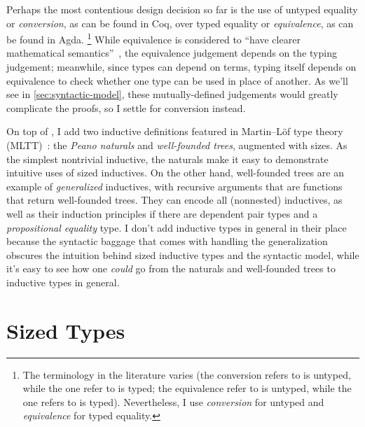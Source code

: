 Perhaps the most contentious design decision so far is the use of untyped equality
or \emph{conversion}, as can be found in Coq,
over typed equality or \emph{equivalence},
as can be found in Agda.%
\footnote{The terminology in the literature varies
(the conversion \citet{MetaCoq} refers to is untyped, while the one \citet{conversion} refer to is typed;
the equivalence \citet{wjb} refer to is untyped, while the one \citet{equivalence} refers to is typed).
Nevertheless, I use \emph{conversion} for untyped and \emph{equivalence} for typed equality.}
While equivalence is considered to ``have clearer mathematical semantics''~\citep{typed-NbE},
the equivalence judgement depends on the typing judgement;
meanwhile, since types can depend on terms,
typing itself depends on equivalence to check whether one type can be used in place of another.
As we'll see in \cref{sec:syntactic-model}, these mutually-defined judgements would greatly complicate the proofs,
so I settle for conversion instead.

On top of \GCC, I add two inductive definitions featured in Martin--L\"of type theory (MLTT)~\citep{mltt}:
the \emph{Peano naturals} and \emph{well-founded trees}, augmented with sizes.
As the simplest nontrivial inductive,
the naturals make it easy to demonstrate intuitive uses of sized inductives.
On the other hand, well-founded trees are an example of \emph{generalized} inductives,
with recursive arguments that are functions that return well-founded trees.
They can encode all (nonnested) inductives,
as well as their induction principles \citep{whynotW} if there are dependent pair types
and a \emph{propositional equality} type.
I don't add inductive types in general in their place
because the syntactic baggage that comes with handling the generalization
obscures the intuition behind sized inductive types and the syntactic model,
while it's easy to see how one \emph{could} go from the naturals and well-founded trees
to inductive types in general.

\iffalse
Finally, I add a standard \emph{homogeneous propositional equality type}\index{propositional equality},
which isn't particularly difficult to deal with
and will allow for some more interesting examples.
\fi

\section{Sized Types}\label{sec:sized-types}

